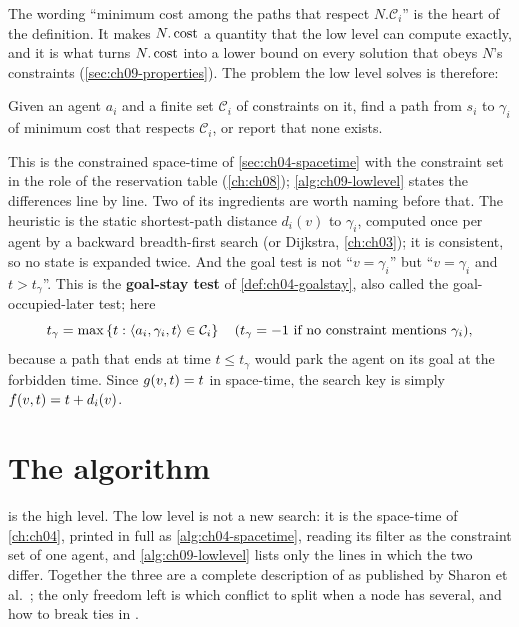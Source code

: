 The wording ``minimum cost among the paths that respect $N.\mathcal{C}_i$''
is the heart of the definition. It makes $N.\operatorname{cost}$ a quantity that the low
level can compute exactly, and it is what turns $N.\operatorname{cost}$ into a lower bound
on every solution that obeys $N$'s constraints (\cref{sec:ch09-properties}).
The problem the low level solves is therefore:

\begin{definition}
\label{def:ch09-lowlevel}
Given an agent $a_i$ and a finite set $\mathcal{C}_i$ of constraints on it,
find a path from $s_i$ to $\gamma_i$ of minimum cost that respects
$\mathcal{C}_i$, or report that none exists.
\end{definition}

This is the constrained space-time \astar of \cref{sec:ch04-spacetime} with the
constraint set in the role of the reservation table (\cref{ch:ch08});
\cref{alg:ch09-lowlevel} states the differences line by line. Two of its
ingredients are worth naming before that. The heuristic is the static
shortest-path distance
$d_i(v)$ to $\gamma_i$, computed once per agent by a backward breadth-first
search (or Dijkstra, \cref{ch:ch03}); it is consistent, so no state is
expanded twice. And the goal test is not ``$v = \gamma_i$'' but ``$v =
\gamma_i$ and $t > t_\gamma$''. This is the \textbf{goal-stay
test} of \cref{def:ch04-goalstay}, also called the
goal-occupied-later test; here
\begin{equation}
\label{eq:ch09-tgamma}
t_\gamma = \max\left\{ t : \langle a_i, \gamma_i, t\rangle \in \mathcal{C}_i \right\}
\quad (t_\gamma = -1 \text{ if no constraint mentions } \gamma_i),
\end{equation}
because a path that ends at time $t \le t_\gamma$ would park the agent on
its goal at the forbidden time. Since $g(v,t) = t$ in space-time, the
search key is simply $f(v,t) = t + d_i(v)$.

\section{The algorithm}
\label{sec:ch09-algorithm}

 is the high level. The low level is not a new search: it is the
space-time \astar of \cref{ch:ch04}, printed in full as \cref{alg:ch04-spacetime},
reading its filter as the constraint set of one agent, and \cref{alg:ch09-lowlevel}
lists only the lines in which the two differ. Together the three are a complete
description of \cbs as published by
Sharon et al.~\cite{sharon2015cbs}; the only freedom left is which conflict
to split when a node has several, and how to break ties in \Open.

